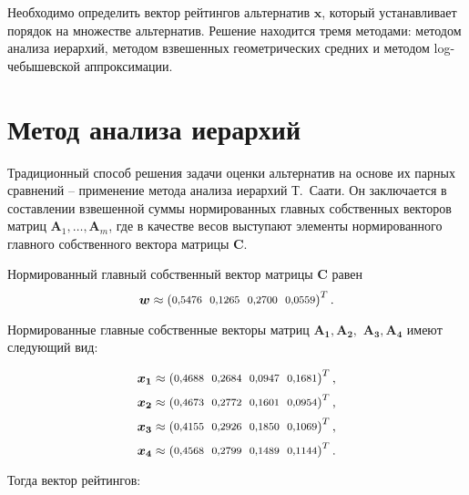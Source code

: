 \documentclass{math-mech-sci}
\begin{document}
Необходимо определить вектор рейтингов альтернатив $\boldsymbol{x}$, который устанавливает порядок на множестве альтернатив. Решение находится тремя методами: методом анализа иерархий, методом взвешенных геометрических
средних и методом log-чебышевской аппроксимации.

\section{Метод анализа иерархий}

Традиционный способ решения задачи оценки альтернатив на основе их
парных сравнений --  применение метода анализа иерархий Т.~Саати. 
Он заключается в составлении взвешенной суммы нормированных главных собственных векторов матриц $\boldsymbol{A}_1, \ldots, \boldsymbol{A}_m$, где в качестве весов выступают элементы нормированного главного собственного вектора матрицы $\boldsymbol{C}$. 

Нормированный главный собственный вектор матрицы $\boldsymbol{C}$ равен
$$
\boldsymbol{w}\approx 
\setlength{\arraycolsep}{3pt}
\footnotesize
\begin{pmatrix}
0{,}5476 & 0{,}1265 & 0{,}2700 & 0{,}0559
\end{pmatrix}^T.
$$
\vspace{0.3ex}

Нормированные главные собственные векторы матриц $ \boldsymbol{A_1}, \boldsymbol{A_2},$ $\boldsymbol{A_3}, \boldsymbol{A_4}$ имеют следующий вид:

\[
\boldsymbol{x_1}\approx 
\setlength{\arraycolsep}{3pt}
\footnotesize
\begin{pmatrix}
0{,}4688 & 0{,}2684 & 0{,}0947 & 0{,}1681
\end{pmatrix}^T,
\]
\[
\boldsymbol{x_2}\approx 
\setlength{\arraycolsep}{3pt}
\footnotesize
\begin{pmatrix}
0{,}4673 & 0{,}2772 & 0{,}1601 & 0{,}0954
\end{pmatrix}^T,
\]
\[
\boldsymbol{x_3}\approx 
\footnotesize
\setlength{\arraycolsep}{3pt}
\begin{pmatrix}
0{,}4155 & 0{,}2926 & 0{,}1850 & 0{,}1069
\end{pmatrix}^T,
\]
\[
\boldsymbol{x_4}\approx 
\footnotesize
\setlength{\arraycolsep}{3pt}
\begin{pmatrix}
0{,}4568 & 0{,}2799 & 0{,}1489 & 0{,}1144
\end{pmatrix}^T.
\]
\vspace{-0.2ex}

Тогда вектор рейтингов:
\vspace{-0.6ex}
\end{document}
